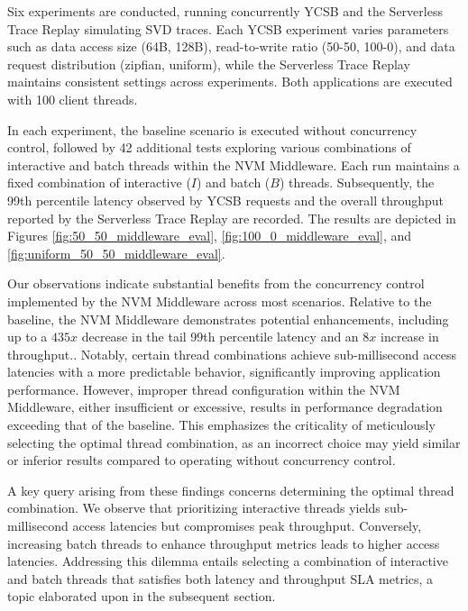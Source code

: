 Six experiments are conducted, running concurrently YCSB and the Serverless Trace Replay simulating SVD traces. Each YCSB experiment varies parameters such as data access size (64B, 128B), read-to-write ratio (50-50, 100-0), and data request distribution (zipfian, uniform), while the Serverless Trace Replay maintains consistent settings across experiments. Both applications are executed with 100 client threads.

In each experiment, the baseline scenario is executed without concurrency control, followed by 42 additional tests exploring various combinations of interactive and batch threads within the NVM Middleware. Each run maintains a fixed combination of interactive ($I$) and batch ($B$) threads. Subsequently, the 99th percentile latency observed by YCSB requests and the overall throughput reported by the Serverless Trace Replay are recorded. The results are depicted in Figures \ref{fig:50_50_middleware_eval}, \ref{fig:100_0_middleware_eval}, and \ref{fig:uniform_50_50_middleware_eval}.

Our observations indicate substantial benefits from the concurrency control implemented by the NVM Middleware across most scenarios. Relative to the baseline, the NVM Middleware demonstrates potential enhancements,  including up to a $435x$ decrease in the tail 99th percentile latency and an $8x$ increase in throughput.. Notably, certain thread combinations achieve sub-millisecond access latencies with a more predictable behavior, significantly improving application performance. However, improper thread configuration within the NVM Middleware, either insufficient or excessive, results in performance degradation exceeding that of the baseline. This emphasizes the criticality of meticulously selecting the optimal thread combination, as an incorrect choice may yield similar or inferior results compared to operating without concurrency control.

A key query arising from these findings concerns determining the optimal thread combination. We observe that prioritizing interactive threads yields sub-millisecond access latencies but compromises peak throughput. Conversely, increasing batch threads to enhance throughput metrics leads to higher access latencies. Addressing this dilemma entails selecting a combination of interactive and batch threads that satisfies both latency and throughput SLA metrics, a topic elaborated upon in the subsequent section.

